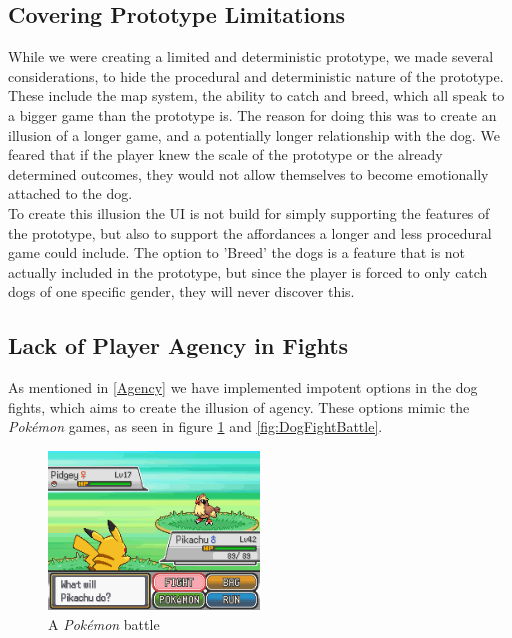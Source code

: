 
\subsection{Covering Prototype Limitations}
While we were creating a limited and deterministic prototype, we made several considerations, to hide the procedural and deterministic nature of the prototype. These include the map system, the ability to catch and breed, which all speak to a bigger game than the prototype is. The reason for doing this was to create an illusion of a longer game, and a potentially longer relationship with the dog. We feared that if the player knew the scale of the prototype or the already determined outcomes, they would not allow themselves to become emotionally attached to the dog. \\

To create this illusion the UI is not build for simply supporting the features of the prototype, but also to support the affordances a longer and less procedural game could include. The option to 'Breed' the dogs is a feature that is not actually included in the prototype, but since the player is forced to only catch dogs of one specific gender, they will never discover this.\\

\subsection{Lack of Player Agency in Fights}
As mentioned in \ref{Agency} we have implemented impotent options in the dog fights, which aims to create the illusion of agency. These options mimic the \textit{Pokémon} games, as seen in figure \ref{fig:PokeBattle} and \ref{fig:DogFightBattle}. 

\begin{figure}[h!] 
	\centering
    \includegraphics[width=0.5\textwidth]{PokemonBattle.png}
    \caption{A \textit{Pokémon} battle}
    \label{fig:PokeBattle}
\end{figure}

